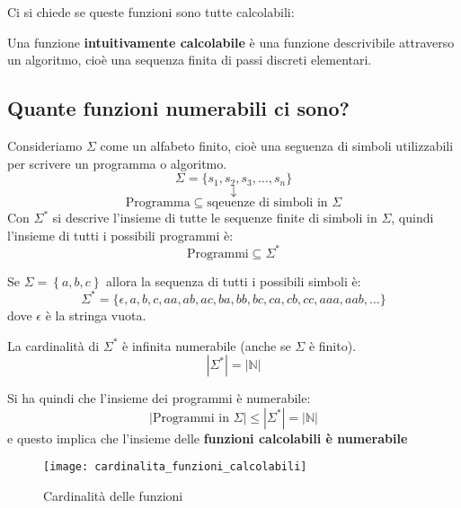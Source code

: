 \documentclass[a4paper]{article}
\begin{document}
\vspace{1em}
\noindent
Ci si chiede se queste funzioni sono tutte calcolabili:
\begin{definition}
  Una funzione \textbf{intuitivamente calcolabile} è una funzione descrivibile attraverso
  un algoritmo, cioè una sequenza finita di passi discreti elementari.
\end{definition}

\subsection{Quante funzioni numerabili ci sono?}
Consideriamo \( \Sigma \) come un alfabeto finito, cioè una seguenza di simboli
utilizzabili per scrivere un programma o algoritmo.
\[
  \Sigma = \{s_1,s_2,s_3, \ldots, s_n\}
\] 
\[
  \downarrow
\] 
\[
  \text{Programma} \subseteq \text{sqeuenze di simboli in } \Sigma
\] 
Con \( \Sigma^* \) si descrive l'insieme di tutte le sequenze finite di simboli in \( \Sigma \),
quindi l'insieme di tutti i possibili programmi è:
\[
  \text{Programmi} \subseteq \Sigma^*
\]

\begin{example}
  Se \( \Sigma = \left\{ a, b, c \right\} \) allora la sequenza di tutti i possibili
  simboli è:
  \[
    \Sigma^* = \{\epsilon, a, b, c, aa, ab, ac, ba, bb, bc, ca, cb, cc, aaa, aab, \ldots\}
  \]
  dove \( \epsilon \) è la stringa vuota.

  La cardinalità di \( \Sigma^* \) è infinita numerabile (anche se \( \Sigma  \) è finito).
  \[
    \left| \Sigma^* \right| = \left| \mathbb{N} \right| 
  \] 
\end{example}

Si ha quindi che l'insieme dei programmi è numerabile:
\[
  \left| \text{Programmi in } \Sigma \right| \leq \left| \Sigma^* \right| = \left| \mathbb{N} \right|
\] 
e questo implica che l'insieme delle \textbf{funzioni calcolabili è numerabile}

\begin{figure}[H]
  \centering
  \texttt{[image: cardinalita\_funzioni\_calcolabili]}
  \caption{Cardinalità delle funzioni}
\end{figure}
\end{document}
